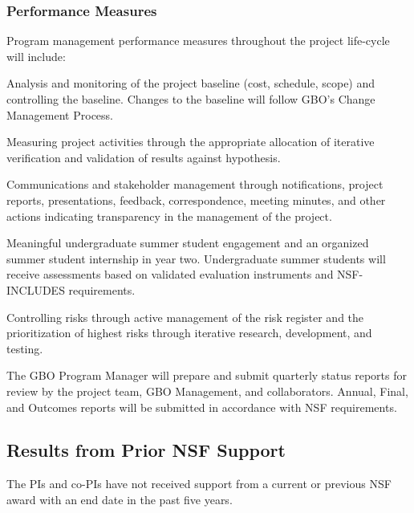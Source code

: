 \documentclass[10pt]{myNSF}
\begin{document}
\subsubsection{Performance Measures}
\label{sec:performance_measures}

Program management performance measures throughout the project
life-cycle will include:
\begin{itemize*}
\item{Analysis and monitoring of the project baseline (cost, schedule,
  scope) and controlling the baseline.  Changes to the baseline will
  follow GBO’s Change Management Process.}
\item{Measuring project activities through the appropriate allocation
  of iterative verification and validation of results against
  hypothesis.}
\item{Communications and stakeholder management through notifications,
  project reports, presentations, feedback, correspondence, meeting
  minutes, and other actions indicating transparency in the management
  of the project.}
\item{Meaningful undergraduate summer student engagement and an
  organized summer student internship in year two. Undergraduate
  summer students will receive assessments based on validated
  evaluation instruments and NSF-INCLUDES requirements.}
\item{Controlling risks through active management of the risk register
  and the prioritization of highest risks through iterative research,
  development, and testing.}
\end{itemize*}
The GBO Program Manager will prepare and submit quarterly status
reports for review by the project team, GBO Management, and
collaborators. Annual, Final, and Outcomes reports will be submitted
in accordance with NSF requirements.

\subsection{Results from Prior NSF Support}
\label{sec:prior_support}

The PIs and co-PIs have not received support from a current or
previous NSF award with an end date in the past five years.

{}

\end{document}
